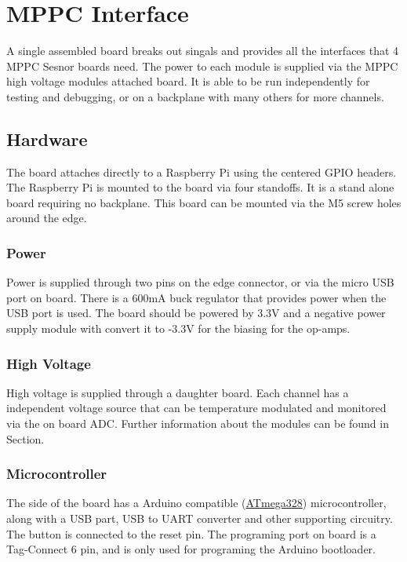\section{MPPC Interface}

A single assembled board breaks out singals and provides all the interfaces that 4 MPPC Sesnor boards need. The power to each module is supplied via the MPPC high voltage modules attached board. It is able to be run independently for testing and debugging, or on a backplane with many others for more channels.


\subsection{Hardware}
The board attaches directly to a Raspberry Pi using the centered GPIO headers. The Raspberry Pi is mounted to the board via four standoffs. It is a stand alone board requiring no backplane. This board can be mounted via the M5 screw holes around the edge.

\subsubsection{Power}
Power is supplied through two pins on the edge connector, or via the micro USB port on board. There is a 600mA buck regulator that provides power when the USB port is used. The board should be powered by 3.3V and a negative power supply module with convert it to -3.3V for the biasing for the op-amps.

\subsubsection{High Voltage}
High voltage is supplied through a daughter board. Each channel has a independent voltage source that can be temperature modulated and monitored via the on board ADC. Further information about the modules can be found in Section.

\subsubsection{Microcontroller}
The side of the board has a Arduino compatible (\href{http://www.atmel.com/images/Atmel-8271-8-bit-AVR-Microcontroller-ATmega48A-48PA-88A-88PA-168A-168PA-328-328P_datasheet_Complete.pdf}{ATmega328}) microcontroller, along with a USB part, USB to UART converter and other supporting circuitry. The button is connected to the reset pin. The programing port on board is a Tag-Connect 6 pin, and is only used for programing the Arduino bootloader.


